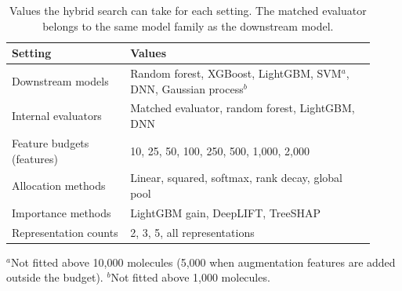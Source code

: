 \begin{table}[htbp]
\centering
\begin{adjustbox}{max width=\textwidth,max totalheight=0.78\textheight}
\begin{tabular}{@{}P{0.30\linewidth}P{0.62\linewidth}@{}}
\toprule
Setting & Values \\
\midrule
Downstream models & Random forest, XGBoost, LightGBM, SVM$^{a}$, DNN, Gaussian process$^{b}$ \\
Internal evaluators & Matched evaluator, random forest, LightGBM, DNN \\
Feature budgets (features) & 10, 25, 50, 100, 250, 500, 1{,}000, 2{,}000 \\
Allocation methods & Linear, squared, softmax, rank decay, global pool \\
Importance methods & LightGBM gain, DeepLIFT, TreeSHAP \\
Representation counts & 2, 3, 5, all representations \\
\bottomrule
\end{tabular}
\end{adjustbox}

\smallskip
{\footnotesize $^{a}$Not fitted above 10{,}000 molecules (5{,}000 when augmentation features are added outside the budget). $^{b}$Not fitted above 1{,}000 molecules.}
\caption[Values the hybrid search can take for each setting.]{Values the hybrid search can take for each setting. The matched evaluator belongs to the same model family as the downstream model.}
\label{tab:search_tiers}
\end{table}

